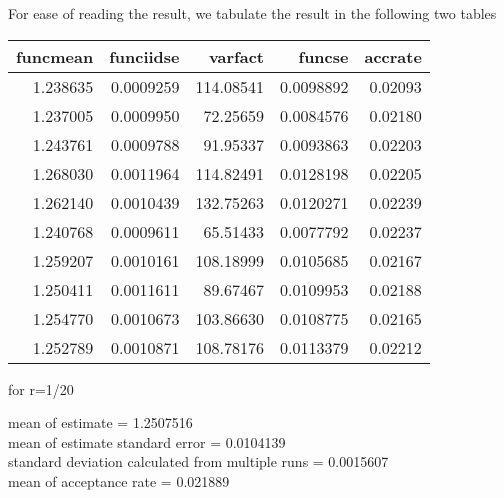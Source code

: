 For ease of reading the result, we tabulate the result in the following two tables\\
\begin{center}
\begin{knitrout}
\color{fgcolor}
\begin{tabular}{r|r|r|r|r}
\hline
funcmean & funciidse & varfact & funcse & accrate\\
\hline
1.238635 & 0.0009259 & 114.08541 & 0.0098892 & 0.02093\\
\hline
1.237005 & 0.0009950 & 72.25659 & 0.0084576 & 0.02180\\
\hline
1.243761 & 0.0009788 & 91.95337 & 0.0093863 & 0.02203\\
\hline
1.268030 & 0.0011964 & 114.82491 & 0.0128198 & 0.02205\\
\hline
1.262140 & 0.0010439 & 132.75263 & 0.0120271 & 0.02239\\
\hline
1.240768 & 0.0009611 & 65.51433 & 0.0077792 & 0.02237\\
\hline
1.259207 & 0.0010161 & 108.18999 & 0.0105685 & 0.02167\\
\hline
1.250411 & 0.0011611 & 89.67467 & 0.0109953 & 0.02188\\
\hline
1.254770 & 0.0010673 & 103.86630 & 0.0108775 & 0.02165\\
\hline
1.252789 & 0.0010871 & 108.78176 & 0.0113379 & 0.02212\\
\hline
\end{tabular}


\end{knitrout}
for r=1/20
\end{center}
mean of estimate = 1.2507516\\
mean of estimate standard error = 0.0104139\\
standard deviation calculated from multiple runs = 0.0015607\\
mean of acceptance rate = 0.021889\\
